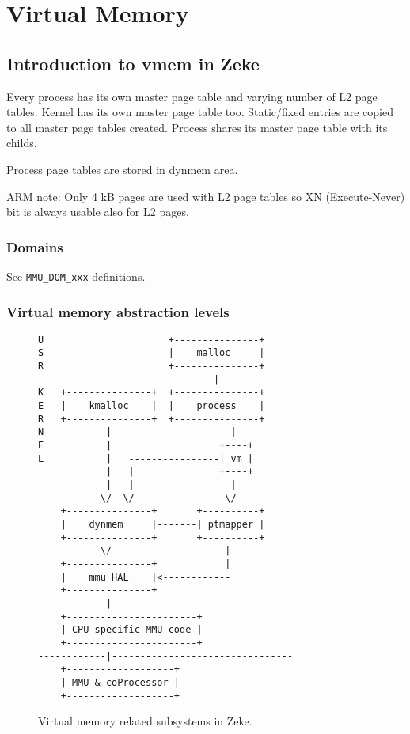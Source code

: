 \chapter{Virtual Memory}

\section{Introduction to vmem in Zeke}

Every process has its own master page table and varying number of L2 page
tables. Kernel has its own master page table too. Static/fixed entries are
copied to all master page tables created. Process shares its master page
table with its childs.

Process page tables are stored in dynmem area.

ARM note: Only 4 kB pages are used with L2 page tables so XN (Execute-Never) bit
is always usable also for L2 pages.

\subsection{Domains}

See \verb+MMU_DOM_xxx+ definitions.

\subsection{Virtual memory abstraction levels}

\begin{figure}
\begin{verbatim}
U                      +---------------+
S                      |    malloc     |
R                      +---------------+
-------------------------------|-------------
K   +---------------+  +---------------+
E   |    kmalloc    |  |    process    |
R   +---------------+  +---------------+
N           |                     |
E           |                   +----+
L           |   ----------------| vm |
            |   |               +----+
            |   |                 |
           \/  \/                \/
    +---------------+       +----------+
    |    dynmem     |-------| ptmapper |
    +---------------+       +----------+
           \/                    |
    +---------------+            |
    |    mmu HAL    |<------------
    +---------------+
            |
    +-----------------------+
    | CPU specific MMU code |
    +-----------------------+
------------|--------------------------------
    +-------------------+
    | MMU & coProcessor |
    +-------------------+
\end{verbatim}
\caption{Virtual memory related subsystems in Zeke.}
\label{figure:vmsubsys}
\end{figure}

